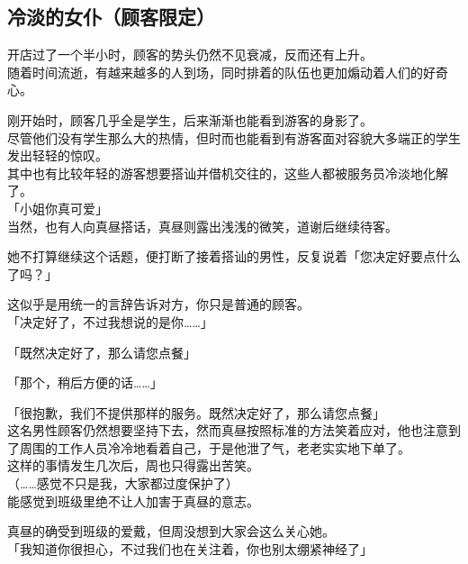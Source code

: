 \subsection{冷淡的女仆（顾客限定）}

开店过了一个半小时，顾客的势头仍然不见衰减，反而还有上升。\\

随着时间流逝，有越来越多的人到场，同时排着的队伍也更加煽动着人们的好奇心。

刚开始时，顾客几乎全是学生，后来渐渐也能看到游客的身影了。\\

尽管他们没有学生那么大的热情，但时而也能看到有游客面对容貌大多端正的学生发出轻轻的惊叹。\\

其中也有比较年轻的游客想要搭讪并借机交往的，这些人都被服务员冷淡地化解了。\\

「小姐你真可爱」\\

当然，也有人向真昼搭话，真昼则露出浅浅的微笑，道谢后继续待客。

她不打算继续这个话题，便打断了接着搭讪的男性，反复说着「您决定好要点什么了吗？」

这似乎是用统一的言辞告诉对方，你只是普通的顾客。\\

「决定好了，不过我想说的是你……」

「既然决定好了，那么请您点餐」

「那个，稍后方便的话……」

「很抱歉，我们不提供那样的服务。既然决定好了，那么请您点餐」\\

这名男性顾客仍然想要坚持下去，然而真昼按照标准的方法笑着应对，他也注意到了周围的工作人员冷冷地看着自己，于是他泄了气，老老实实地下单了。\\

这样的事情发生几次后，周也只得露出苦笑。\\

（……感觉不只是我，大家都过度保护了）\\

能感觉到班级里绝不让人加害于真昼的意志。

真昼的确受到班级的爱戴，但周没想到大家会这么关心她。\\

「我知道你很担心，不过我们也在关注着，你也别太绷紧神经了」\\

